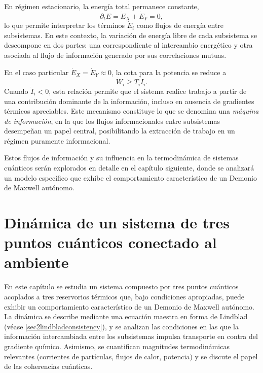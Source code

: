 En régimen estacionario, la energía total permanece constante,
\[
    \partial_{t}E = \dot{E}_{X} + \dot{E}_{Y} = 0,
\]
lo que permite interpretar los términos $\dot{E}_{i}$ como flujos de energía entre subsistemas. En este contexto, la variación de energía libre de cada subsistema se descompone en dos partes: una correspondiente al intercambio energético y otra asociada al flujo de información generado por sus correlaciones mutuas.

En el caso particular $\dot{E}_{X} = \dot{E}_{Y} \approx 0$, la cota para la potencia se reduce a
\[
     \dot{W}_{i} \geq T_{i}\dot{I}_{i}.
\]
Cuando $\dot{I}_{i}<0$, esta relación permite que el sistema realice trabajo a partir de una contribución dominante de la información, incluso en ausencia de gradientes térmicos apreciables. Este mecanismo constituye lo que se denomina una \textit{máquina de información}, en la que los flujos informacionales entre subsistemas desempeñan un papel central, posibilitando la extracción de trabajo en un régimen puramente informacional. 

Estos flujos de información y su influencia en la termodinámica de sistemas cuánticos serán explorados en detalle en el capítulo siguiente, donde se analizará un modelo específico que exhibe el comportamiento característico de un Demonio de Maxwell autónomo.

\label{sec4:flujos0}

\chapter{Dinámica de un sistema de tres puntos cuánticos conectado al ambiente}

En este capítulo se estudia un sistema compuesto por tres puntos cuánticos acoplados a tres reservorios térmicos que, bajo condiciones apropiadas, puede exhibir un comportamiento característico de un Demonio de Maxwell autónomo. La dinámica se describe mediante una ecuación maestra en forma de Lindblad (véase \ref{sec2lindbladconsistency}), y se analizan las condiciones en las que la información intercambiada entre los subsistemas impulsa transporte en contra del gradiente químico. Asimismo, se cuantifican magnitudes termodinámicas relevantes (corrientes de partículas, flujos de calor, potencia) y se discute el papel de las coherencias cuánticas.

